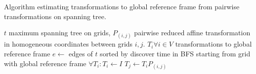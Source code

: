 \documentclass[17pt, a0paper, portrait]{tikzposter}
\begin{document}
\begin{columns}
{\begin{algorithm}[H]
    \caption{Algorithm estimating transformations to global reference frame from pairwise transformations on spanning tree.}
    \label{alg:estimatefinaltrans}
    \begin{algorithmic}[1]
        \Require $t$ maximum spanning tree on grids, $P_{(i,j)}$ pairwise reduced affine transformation in homogeneous coordinates between grids $i, j$.
        \Ensure $T_i \forall i \in V$ transformations to global reference frame
            \State $e \gets$ edges of $t$ sorted by discover time in \gls{BFS} starting from grid with global reference frame 
            \State $\forall T_i: T_i \gets I$ 
                $T_j \gets T_i P_{(i,j)}$
            \EndFor
        \EndProcedure
    \end{algorithmic}
\end{algorithm}
} %


\end{columns}
\end{document}
